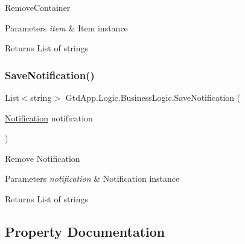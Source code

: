Remove\+Container 


\begin{DoxyParams}{Parameters}
{\em item} & Item instance\\
\hline
\end{DoxyParams}
\begin{DoxyReturn}{Returns}
List of strings
\end{DoxyReturn}
\mbox{\label{class_gtd_app_1_1_logic_1_1_business_logic_afa15e2ec378237a34cc2d8fd14c281d6}} 
\subsubsection{\texorpdfstring{Save\+Notification()}{SaveNotification()}}
{\footnotesize\ttfamily List$<$string$>$ Gtd\+App.\+Logic.\+Business\+Logic.\+Save\+Notification (\begin{DoxyParamCaption}\item[{\mbox{\hyperlink{class_gtd_app_1_1_data_1_1_notification}{Notification}}}]{notification }\end{DoxyParamCaption})}



Remove Notification 


\begin{DoxyParams}{Parameters}
{\em notification} & Notification instance\\
\hline
\end{DoxyParams}
\begin{DoxyReturn}{Returns}
List of strings
\end{DoxyReturn}


\subsection{Property Documentation}
\mbox{\label{class_gtd_app_1_1_logic_1_1_business_logic_ace91111fd0843da6dc450eb0557437e2}} 
